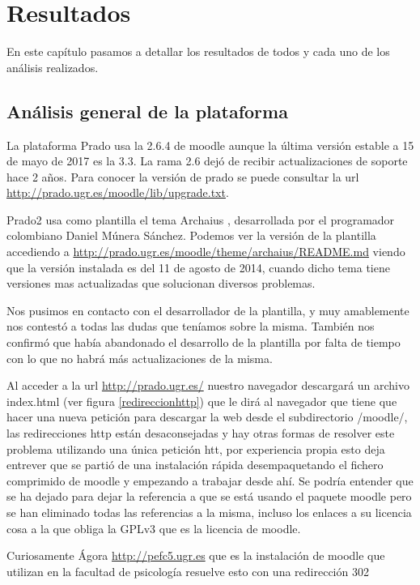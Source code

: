 \chapter{Resultados}

En este capítulo pasamos a detallar los resultados de todos y cada uno de los análisis realizados.

\section{Análisis general de la plataforma}

La plataforma Prado usa la 2.6.4 de moodle aunque la última versión estable a 15 de mayo de 2017 es la 3.3. La rama 2.6 dejó de recibir actualizaciones de soporte hace 2 años. Para conocer la versión de prado se puede consultar la url \url{http://prado.ugr.es/moodle/lib/upgrade.txt}.

\bigskip
Prado2 usa como plantilla el tema Archaius \cite{moodletheme}, desarrollada por el programador colombiano Daniel Múnera Sánchez. Podemos ver la versión de la plantilla accediendo a \url{http://prado.ugr.es/moodle/theme/archaius/README.md} viendo que la versión instalada es del 11 de agosto de 2014, cuando dicho tema tiene versiones mas actualizadas que solucionan diversos problemas.

\bigskip
Nos pusimos en contacto con el desarrollador de la plantilla, y muy amablemente nos contestó a todas las dudas que teníamos sobre la misma. También nos confirmó que había abandonado el desarrollo de la plantilla por falta de tiempo con lo que no habrá más actualizaciones de la misma.

\bigskip
Al acceder a la url \url{http://prado.ugr.es/} nuestro navegador descargará un archivo index.html (ver figura \ref{redireccionhttp}) que le dirá al navegador que tiene que hacer una nueva petición para descargar la web desde el subdirectorio /moodle/, las redirecciones http están desaconsejadas y hay otras formas de resolver este problema utilizando una única petición htt, por experiencia propia esto deja entrever que se partió de una instalación rápida desempaquetando el fichero comprimido de moodle y empezando a trabajar desde ahí. Se podría entender que se ha dejado para dejar la referencia a que se está usando el paquete moodle pero se han eliminado todas las referencias a la misma, incluso los enlaces a su licencia cosa a la que obliga la GPLv3 que es la licencia de moodle.

\bigskip
Curiosamente Ágora \url{http://pefc5.ugr.es} que es la instalación de moodle que utilizan en la facultad de psicología resuelve esto con una redirección 302

